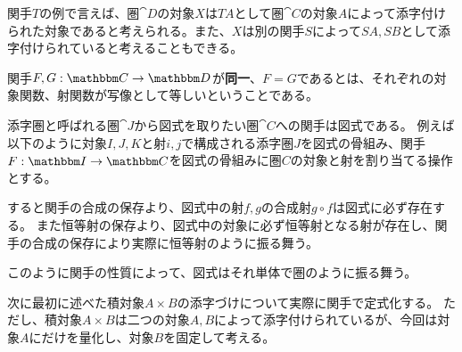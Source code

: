   関手$T$の例で言えば、圏$\cat{D}$の対象$X$は$TA$として圏$\cat{C}$の対象$A$によって添字付けられた対象であると考えられる。また、$X$は別の関手$S$によって$SA,SB$として添字付けられていると考えることもできる。

	\begin{define}[関手の同一性]
		関手$\functor{F,G}{C}{D}$が\textbf{同一}、$F=G$であるとは、それぞれの対象関数、射関数が写像として等しいということである。
	\end{define}


	\begin{prop}[図式の圏論的な定義]
		添字圏と呼ばれる圏$\cat{J}$から図式を取りたい圏$\cat{C}$への関手は図式である。
		例えば以下のように対象$I,J,K$と射$i,j$で構成される添字圏$J$を図式の骨組み、関手$\functor{F}{I}{C}$を図式の骨組みに圏$C$の対象と射を割り当てる操作とする。

		すると関手の合成の保存より、図式中の射$f,g$の合成射$g\circ f$は図式に必ず存在する。
    また恒等射の保存より、図式中の対象に必ず恒等射となる射が存在し、関手の合成の保存により実際に恒等射のように振る舞う。

    このように関手の性質によって、図式はそれ単体で圏のように振る舞う。
		\begin{center}
		\end{center}
	\end{prop}
  次に最初に述べた積対象$A\times B$の添字づけについて実際に関手で定式化する。
  ただし、積対象$A\times B$は二つの対象$A,B$によって添字付けられているが、今回は対象$A$にだけを量化し、対象$B$を固定して考える。
